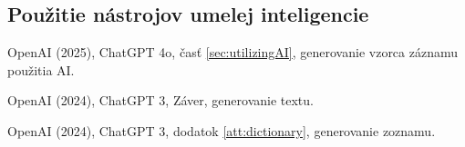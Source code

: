 {}
\subsection*{Použitie nástrojov umelej inteligencie}

\begin{trivlist}
\item OpenAI (2025), ChatGPT 4o, časť \ref{sec:utilizingAI}, generovanie vzorca záznamu použitia AI.

\item OpenAI (2024), ChatGPT 3, Záver, generovanie textu.

\item OpenAI (2024), ChatGPT 3, dodatok \ref{att:dictionary}, generovanie zoznamu.
\end{trivlist}
